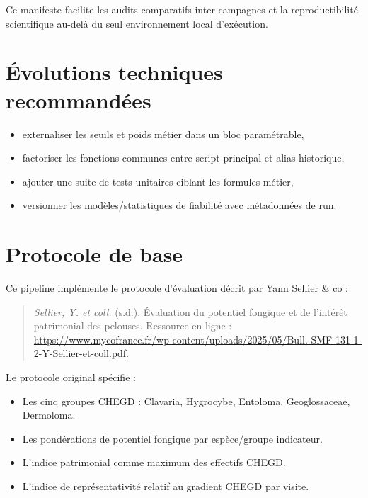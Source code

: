 \documentclass[11pt,a4paper]{article}
\begin{document}
Ce manifeste facilite les audits comparatifs inter-campagnes et la reproductibilit\'e
scientifique au-delà du seul environnement local d'ex\'ecution.

\section{Évolutions techniques recommand\'ees}
\begin{itemize}[leftmargin=1.2cm]
  \item externaliser les seuils et poids m\'etier dans un bloc param\'etrable,
  \item factoriser les fonctions communes entre script principal et alias historique,
  \item ajouter une suite de tests unitaires ciblant les formules m\'etier,
  \item versionner les modèles/statistiques de fiabilit\'e avec m\'etadonn\'ees de run.
\end{itemize}

\section{Protocole de base}
Ce pipeline impl\'emente le protocole d'\'evaluation d\'ecrit par Yann Sellier \& co :

\begin{quote}
  \textit{Sellier, Y. et coll.} (s.d.). Évaluation du potentiel fongique et de l'int\'erêt patrimonial des pelouses.
  Ressource en ligne : \url{https://www.mycofrance.fr/wp-content/uploads/2025/05/Bull.-SMF-131-1-2-Y-Sellier-et-coll.pdf}.
\end{quote}

Le protocole original sp\'ecifie : 
\begin{itemize}[leftmargin=1.2cm]
  \item Les cinq groupes CHEGD : Clavaria, Hygrocybe, Entoloma, Geoglossaceae, Dermoloma.
  \item Les pond\'erations de potentiel fongique par espèce/groupe indicateur.
  \item L'indice patrimonial comme maximum des effectifs CHEGD.
  \item L'indice de repr\'esentativit\'e relatif au gradient CHEGD par visite.
\end{itemize}
\end{document}
